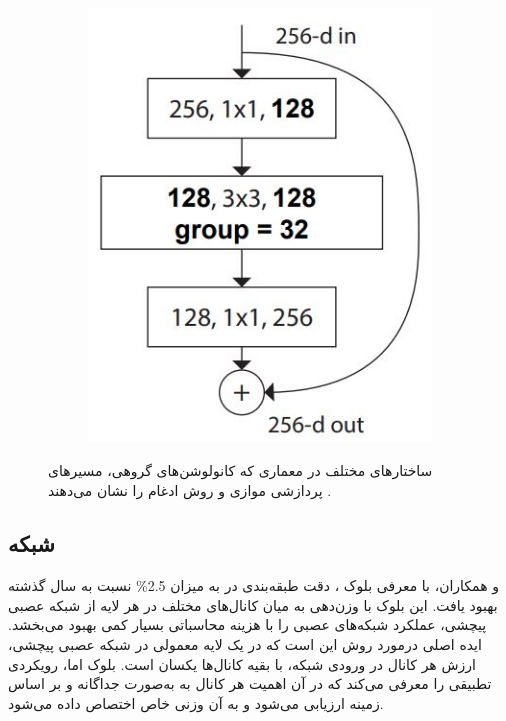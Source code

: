\begin{figure}[h!]
\begin{subfigure}{0.33\textwidth}
        \includegraphics[width=\linewidth]{Images/Chapter2/resnext3.JPG}
        \caption{}
        \label{fig:ch2-resnext3}
    \end{subfigure}
    \caption{ساختارهای مختلف در معماری 
     که کانولوشن‌های گروهی، مسیرهای پردازشی موازی و روش ادغام را نشان می‌دهند
     \cite{xie2017aggregated}.}
    \label{fig:fig:ch2-resnext}
\end{figure}







\subsection{شبکه
}

\cite{hu2018squeeze}
و همکاران،‌ با معرفی بلوک
 ، دقت طبقه‌بندی در  به میزان 2.5\% نسبت به سال گذشته بهبود یافت. این بلوک با وزن‌دهی به میان کانال‌های مختلف در هر لایه از شبکه عصبی پیچشی، عملکرد شبکه‌های عصبی را با هزینه محاسباتی بسیار کمی بهبود می‌بخشد.
ایده اصلی درمورد روش 
  این است که در یک لایه معمولی در شبکه عصبی پیچشی، ارزش هر کانال در ورودی شبکه، با بقیه کانال‌ها یکسان است. بلوک  اما، رویکردی تطبیقی را معرفی می‌کند که در آن اهمیت هر کانال به به‌صورت جداگانه و بر اساس زمینه ارزیابی می‌شود و به آن وزنی خاص اختصاص داده می‌شود.

